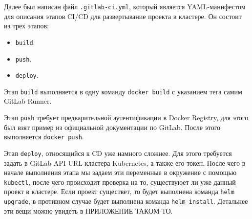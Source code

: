Далее был написан файл \texttt{.gitlab-ci.yml}, который является YAML-манифестом для описания этапов CI/CD для развертывание проекта в кластере. Он состоит из трех этапов:

\begin{itemize}
    \item \texttt{build}.
    \item \texttt{push}.
    \item \texttt{deploy}.
\end{itemize}

Этап \texttt{build} выполняется в одну команду \texttt{docker build} с указанием тега самим GitLab Runner.

Этап \texttt{push} требует предварительной аутентификации в Docker Registry,
для этого был взят пример из официальной документации по GitLab. После этого выполняется \texttt{docker push}.

Этап \texttt{deploy}, относящийся к CD уже намного сложнее. Для этого требуется задать в GitLab API
URL
кластера Kubernetes, а также его токен.
После чего в начале выполнения этапа мы задаем эти переменные в окружение с помощью \texttt{kubectl},
после чего происходит проверка на то, существуюет ли уже данный проект в кластере. Если проект существет, то будет выполнена команда \texttt{helm upgrade}, в противном случае будет выполнена команда \texttt{helm install}. Детальнее эти вещи можно увидеть в ПРИЛОЖЕНИЕ ТАКОМ-ТО.
